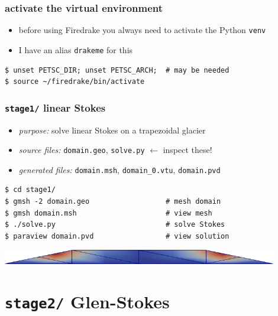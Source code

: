 \documentclass[10pt,hyperref,dvipsnames]{beamer}
\begin{document}
\begin{frame}[fragile]
\frametitle{activate the virtual environment}

\begin{itemize}
\item before using Firedrake you always need to activate the Python \texttt{venv}
\item I have an alias \texttt{drakeme} for this
\end{itemize}

\bigskip
\begin{Verbatim}
$ unset PETSC_DIR; unset PETSC_ARCH;  # may be needed
$ source ~/firedrake/bin/activate
\end{Verbatim}
\end{frame}


\begin{frame}[fragile]
\frametitle{\texttt{stage1/} \qquad linear Stokes}

\begin{itemize}
\item \emph{purpose:} solve linear Stokes on a trapezoidal glacier
\item \emph{source files:} \texttt{domain.geo}, \texttt{solve.py} \hfill \alert{$\gets$ inspect these!}
\item \emph{generated files:} \texttt{domain.msh}, \texttt{domain\_0.vtu}, \texttt{domain.pvd}
\end{itemize}

\bigskip
\begin{Verbatim}
$ cd stage1/
$ gmsh -2 domain.geo                  # mesh domain
$ gmsh domain.msh                     # view mesh
$ ./solve.py                          # solve Stokes
$ paraview domain.pvd                 # view solution
\end{Verbatim}

\vspace{10mm}
\begin{center}
\includegraphics[width=0.9\textwidth]{figs/stage1.png}
\end{center}
\end{frame}


\section{\texttt{stage2/} \qquad Glen-Stokes}
\end{document}
